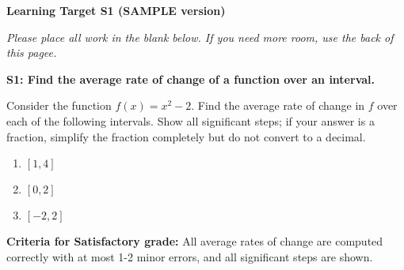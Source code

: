 \documentclass[10pt]{article}
\begin{document}
	\vspace*{0in}

		\begin{center}
			\textbf{Learning Target S1 (SAMPLE version)} \\
		\end{center}

\emph{Please place all work in the blank below. If you need more room, use the back of this pagee.}

\begin{framed}
	\textbf{S1: Find the average rate of change of a function over an interval.}
\end{framed}

Consider the function $f(x) = x^2 - 2$. Find the average rate of change in $f$ over each of the following intervals. Show all significant steps; if your answer is a fraction, simplify the fraction completely but do not convert to a decimal. 

\begin{enumerate}
    \item $[1, 4]$
    \item $[0,2]$
    \item $[-2, 2]$
\end{enumerate}

\vfill


\begin{small}
    \begin{framed}
        	\textbf{Criteria for Satisfactory grade:} All average rates of change are computed correctly with at most 1-2 minor errors, and all significant steps are shown. 
    \end{framed}

\end{small}
\end{document}
